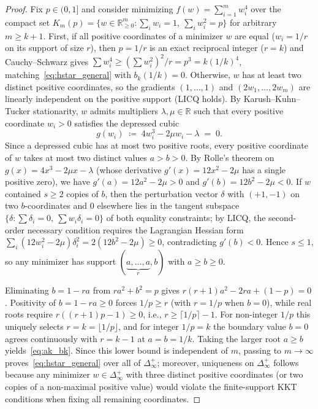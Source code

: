 \documentclass[11pt,a4paper]{article}
\theoremstyle{definition}
\newcommand{\R}{\mathbb{R}}
\begin{document}
\begin{proof}
Fix $p \in (0,1]$ and consider minimizing $f(w) = \sum_{i=1}^m w_i^4$ over the compact set $K_m(p) = \{w \in \R_{\ge 0}^m : \sum_i w_i = 1,\ \sum_i w_i^2 = p\}$ for arbitrary $m \ge k+1$. First, if all positive coordinates of a minimizer $w$ are equal ($w_i = 1/r$ on its support of size $r$), then $p = 1/r$ is an exact reciprocal integer ($r = k$) and Cauchy--Schwarz gives $\sum w_i^4 \ge (\sum w_i^2)^2/r = p^3 = k(1/k)^4$, matching~\eqref{eq:hstar_general} with $b_k(1/k) = 0$. Otherwise, $w$ has at least two distinct positive coordinates, so the gradients $(1,\dots,1)$ and $(2w_1,\dots,2w_m)$ are linearly independent on the positive support (LICQ holds). By Karush--Kuhn--Tucker stationarity, $w$ admits multipliers $\lambda, \mu \in \R$ such that every positive coordinate $w_i > 0$ satisfies the depressed cubic
\begin{equation}
  g(w_i) \;\coloneqq\; 4 w_i^3 - 2\mu w_i - \lambda \;=\; 0.
  \label{eq:kkt_cubic}
\end{equation}
Since a depressed cubic has at most two positive roots, every positive coordinate of $w$ takes at most two distinct values $a > b > 0$. By Rolle's theorem on $g(x) = 4x^3 - 2\mu x - \lambda$ (whose derivative $g'(x) = 12x^2 - 2\mu$ has a single positive zero), we have $g'(a) = 12a^2 - 2\mu > 0$ and $g'(b) = 12b^2 - 2\mu < 0$. If $w$ contained $s \ge 2$ copies of $b$, then the perturbation vector $\delta$ with $(+1, -1)$ on two $b$-coordinates and $0$ elsewhere lies in the tangent subspace $\{\delta : \sum \delta_i = 0,\ \sum w_i \delta_i = 0\}$ of both equality constraints; by LICQ, the second-order necessary condition requires the Lagrangian Hessian form $\sum_i (12 w_i^2 - 2\mu)\delta_i^2 = 2(12b^2 - 2\mu) \ge 0$, contradicting $g'(b) < 0$. Hence $s \le 1$, so any minimizer has support $(\underbrace{a,\dots,a}_{r}, b)$ with $a \ge b \ge 0$.

Eliminating $b = 1 - r a$ from $r a^2 + b^2 = p$ gives $r(r+1)a^2 - 2ra + (1-p) = 0$. Positivity of $b = 1 - ra \ge 0$ forces $1/p \ge r$ (with $r = 1/p$ when $b=0$), while real roots require $r((r+1)p - 1) \ge 0$, i.e., $r \ge \lceil 1/p \rceil - 1$. For non-integer $1/p$ this uniquely selects $r = k = \lfloor 1/p \rfloor$, and for integer $1/p = k$ the boundary value $b=0$ agrees continuously with $r = k-1$ at $a = b = 1/k$. Taking the larger root $a \ge b$ yields~\eqref{eq:ak_bk}. Since this lower bound is independent of $m$, passing to $m \to \infty$ proves~\eqref{eq:hstar_general} over all of $\Delta_\infty^+$; moreover, uniqueness on $\Delta_\infty^+$ follows because any minimizer $w \in \Delta_\infty^+$ with three distinct positive coordinates (or two copies of a non-maximal positive value) would violate the finite-support KKT conditions when fixing all remaining coordinates.
\end{proof}
\end{document}
